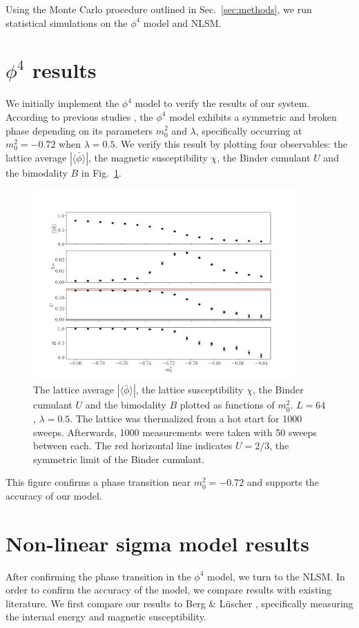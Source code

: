 Using the Monte Carlo procedure outlined in Sec.~\ref{sec:methods}, we run statistical simulations on the $\phi^4$ model and NLSM.
\section{$\phi^4$ results}
We initially implement the $\phi^4$ model to verify the results of our system. According to previous studies \cite{chang1976, monahan2016, schaich2006}, the $\phi^4$ model exhibits a symmetric and broken phase depending on its parameters $m_0^2$ and $\lambda$, specifically occurring at $m_0^2 = -0.72$ when $\lambda = 0.5$. We verify this result by plotting four observables: the lattice average $|\langle\bar\phi\rangle|$, the magnetic susceptibility $\chi$, the Binder cumulant $U$ and the bimodality $B$ in Fig.~\ref{fig:phi4}.
\begin{figure}[h!]
    \centering
      \includegraphics[width=0.9\textwidth]{imgs/phi4.png}
      \caption{\label{fig:phi4} The lattice average $|\langle\bar\phi\rangle|$, the lattice susceptibility $\chi$, the Binder cumulant $U$ and the bimodality $B$ plotted as functions of $m_0^2$. $L=64$, $\lambda=0.5$. The lattice was thermalized from a hot start for 1000 sweeps. Afterwards, 1000 measurements were taken with 50 sweeps between each. The red horizontal line indicates $U=2/3$, the symmetric limit of the Binder cumulant.}
\end{figure}
This figure confirms a phase transition near $m_0^2=-0.72$ and supports the accuracy of our model.

\section{Non-linear sigma model results}
After confirming the phase transition in the $\phi^4$ model, we turn to the NLSM. In order to confirm the accuracy of the model, we compare results with existing literature. We first compare our results to Berg \& L\"uscher \cite{berg1981}, specifically measuring the internal energy and magnetic susceptibility. 

